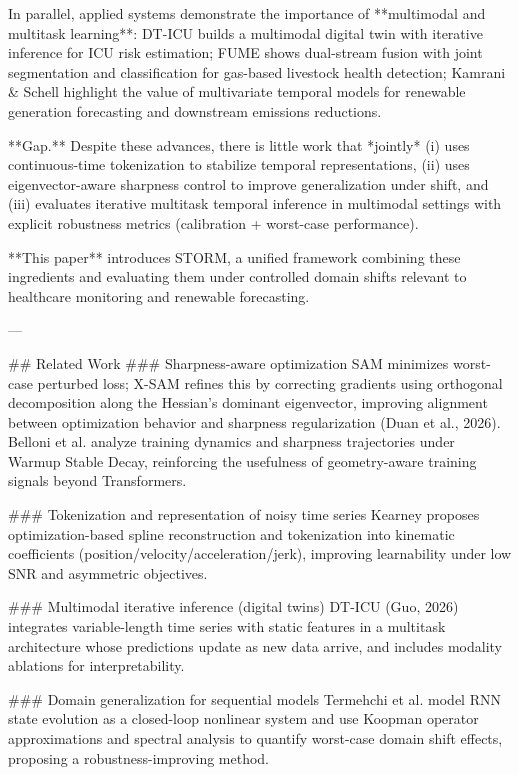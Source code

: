 In parallel, applied systems demonstrate the importance of **multimodal and multitask learning**: DT-ICU builds a multimodal digital twin with iterative inference for ICU risk estimation; FUME shows dual-stream fusion with joint segmentation and classification for gas-based livestock health detection; Kamrani & Schell highlight the value of multivariate temporal models for renewable generation forecasting and downstream emissions reductions.

**Gap.** Despite these advances, there is little work that *jointly* (i) uses continuous-time tokenization to stabilize temporal representations, (ii) uses eigenvector-aware sharpness control to improve generalization under shift, and (iii) evaluates iterative multitask temporal inference in multimodal settings with explicit robustness metrics (calibration + worst-case performance).

**This paper** introduces STORM, a unified framework combining these ingredients and evaluating them under controlled domain shifts relevant to healthcare monitoring and renewable forecasting.

---

## Related Work  
### Sharpness-aware optimization  
SAM minimizes worst-case perturbed loss; X-SAM refines this by correcting gradients using orthogonal decomposition along the Hessian’s dominant eigenvector, improving alignment between optimization behavior and sharpness regularization (Duan et al., 2026). Belloni et al. analyze training dynamics and sharpness trajectories under Warmup Stable Decay, reinforcing the usefulness of geometry-aware training signals beyond Transformers.

### Tokenization and representation of noisy time series  
Kearney proposes optimization-based spline reconstruction and tokenization into kinematic coefficients (position/velocity/acceleration/jerk), improving learnability under low SNR and asymmetric objectives.

### Multimodal iterative inference (digital twins)  
DT-ICU (Guo, 2026) integrates variable-length time series with static features in a multitask architecture whose predictions update as new data arrive, and includes modality ablations for interpretability.

### Domain generalization for sequential models  
Termehchi et al. model RNN state evolution as a closed-loop nonlinear system and use Koopman operator approximations and spectral analysis to quantify worst-case domain shift effects, proposing a robustness-improving method.

